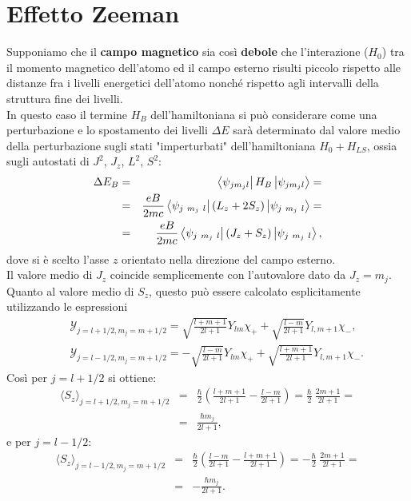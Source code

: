 \documentclass[a4paper,12pt,oneside]{book}
\begin{document}
\section{Effetto Zeeman}
Supponiamo che il \textbf{campo magnetico} sia così \textbf{debole} che l'interazione ($H_0$) tra il momento magnetico dell'atomo ed il campo esterno risulti piccolo rispetto alle distanze fra i livelli energetici dell'atomo nonché rispetto agli intervalli della struttura fine dei livelli. \\
In questo caso il termine $H_B$ dell'hamiltoniana si può considerare come una perturbazione e lo spostamento dei livelli $\Delta E$ sarà determinato dal valore medio della perturbazione sugli stati "imperturbati" dell'hamiltoniana $H_0+H_{LS}$, ossia sugli autostati di $J^2$, $J_z$, $L^2$, $S^2$:
\begin{eqnarray} \label{eq:cap24_5}
\Delta E_B &=& \bra{\psi_{jm_jl}} H_B \ket{\psi_{jm_jl}}= \nonumber \\
& = &\frac{eB}{2mc} \bra{\psi_{j\ m_j\ l}} \left( L_z+2S_z \right)\ket{\psi_{j\ m_j\ l}}= \nonumber\\
& =& \frac{eB}{2mc} \bra{\psi_{j\ m_j\ l}} \left( J_z+S_z \right)\ket{\psi_{j\ m_j\ l}} ,
\end{eqnarray} 
dove si è scelto l'asse $z$ orientato nella direzione del campo esterno. \\
Il valore medio di $J_z$ coincide semplicemente con l'autovalore dato da $J_z=m_j$. Quanto al valore medio di $S_z$, questo può essere calcolato esplicitamente utilizzando le espressioni
\begin{eqnarray}
& & \mathcal{Y}_{j=l+1/2,m_j=m+1/2}=\sqrt{\frac{l+m+1}{2l+1}}Y_{lm}\chi_{+} + \sqrt{\frac{l-m}{2l+1}}Y_{l,m+1}\chi_{-} ,\\
&  &\mathcal{Y}_{j=l-1/2,m_j=m+1/2}=-\sqrt{\frac{l-m}{2l+1}}Y_{lm}\chi_{+} + \sqrt{\frac{l+m+1}{2l+1}}Y_{l,m+1}\chi_{-} .
\end{eqnarray}
Così per $j=l+1/2$ si ottiene:
\begin{eqnarray}
\langle S_z \rangle_{j=l+1/2,m_j=m+1/2} & =& \frac{\hbar}{2} \left( \frac{l+m+1}{2l+1}-\frac{l-m}{2l+1} \right)=\frac{\hbar}{2} \ \frac{2m+1}{2l+1}=  \nonumber \\
& = & \frac{\hbar m_j}{2l+1} ,
\end{eqnarray}
e per $j=l-1/2$:
\begin{eqnarray}
\langle S_z \rangle_{j=l-1/2,m_j=m+1/2} & = &\frac{\hbar}{2} \left( \frac{l-m}{2l+1}-\frac{l+m+1}{2l+1} \right)=-\frac{\hbar}{2} \ \frac{2m+1}{2l+1}=  \nonumber \\
& =& -\frac{\hbar m_j}{2l+1} .
\end{eqnarray}
\end{document}
